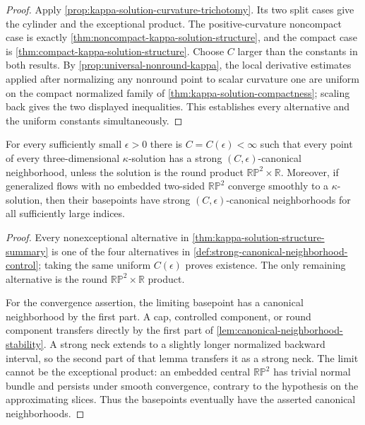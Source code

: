 \begin{proof}
Apply \ref{prop:kappa-solution-curvature-trichotomy}.  Its two split cases
give the cylinder and the exceptional product.  The positive-curvature
noncompact case is exactly
\ref{thm:noncompact-kappa-solution-structure}, and the compact case is
\ref{thm:compact-kappa-solution-structure}.  Choose $C$ larger than the
constants in both results.  By
\ref{prop:universal-nonround-kappa}, the local derivative estimates applied
after normalizing any nonround point to scalar curvature one are uniform on
the compact
normalized family of \ref{thm:kappa-solution-compactness}; scaling back gives
the two displayed inequalities.  This establishes every alternative and
the uniform constants simultaneously.
\end{proof}

\begin{theorem}
\label{thm:kappa-solution-canonical-neighborhoods}
\notready
For every sufficiently small $\epsilon>0$ there is
$C=C(\epsilon)<\infty$ such that every point of every three-dimensional
$\kappa$-solution has a strong $(C,\epsilon)$-canonical neighborhood,
unless the solution is the round product $\mathbb{RP}^2\times\mathbb R$.
Moreover, if generalized flows with no embedded two-sided
$\mathbb{RP}^2$ converge smoothly to a $\kappa$-solution, then their
basepoints have strong $(C,\epsilon)$-canonical neighborhoods for all
sufficiently large indices.
\end{theorem}

\begin{proof}
Every nonexceptional alternative in
\ref{thm:kappa-solution-structure-summary} is one of the four alternatives
in \ref{def:strong-canonical-neighborhood-control}; taking the same uniform
$C(\epsilon)$ proves existence.  The only remaining alternative is the round
$\mathbb{RP}^2\times\mathbb R$ product.

For the convergence assertion, the limiting basepoint has a canonical
neighborhood by the first part.  A cap, controlled component, or round
component transfers directly by the first part of
\ref{lem:canonical-neighborhood-stability}.  A strong neck extends to a
slightly longer normalized backward interval, so the second part of that
lemma transfers it as a strong neck.  The limit cannot be the exceptional
product: an embedded central $\mathbb{RP}^2$ has trivial normal bundle and
persists under smooth convergence, contrary to the hypothesis on the
approximating slices.  Thus the basepoints eventually have the asserted
canonical neighborhoods.
\end{proof}

